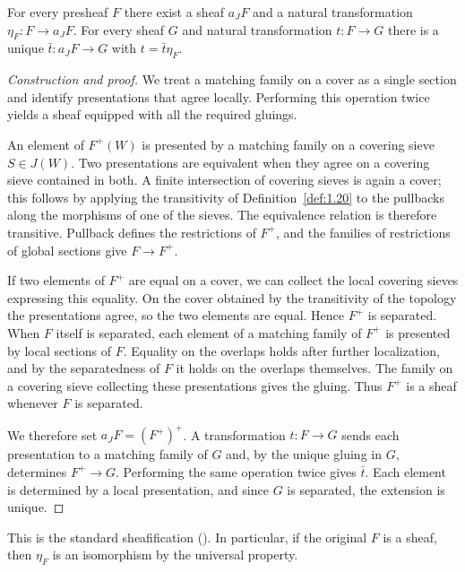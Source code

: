 \begin{proposition}[Sheafification]\label{prop:1.23}

For every presheaf $F$ there exist a sheaf $a_JF$ and a natural transformation
$\eta_F:F\to a_JF$. For every sheaf $G$ and natural transformation
$t:F\to G$ there is a unique $\bar t:a_JF\to G$ with $t=\bar t\eta_F$.

\end{proposition}

\begin{proof}[Construction and proof]

We treat a matching family on a cover as a single section and identify
presentations that agree locally.
Performing this operation twice yields a sheaf equipped with all the required
gluings.

An element of $F^+(W)$ is presented by a matching family on a covering sieve
$S\in J(W)$.
Two presentations are equivalent when they agree on a covering sieve contained
in both.
A finite intersection of covering sieves is again a cover; this follows by
applying the transitivity of Definition~\ref{def:1.20} to the pullbacks along
the morphisms of one of the sieves.
The equivalence relation is therefore transitive.
Pullback defines the restrictions of $F^+$, and the families of restrictions of
global sections give $F\to F^+$.

If two elements of $F^+$ are equal on a cover, we can collect the local covering
sieves expressing this equality. On the cover obtained by the transitivity of
the topology the presentations agree, so the two elements are equal.
Hence $F^+$ is separated.
When $F$ itself is separated, each element of a matching family of $F^+$ is
presented by local sections of $F$. Equality on the overlaps holds after further
localization, and by the separatedness of $F$ it holds on the overlaps themselves.
The family on a covering sieve collecting these presentations gives the gluing.
Thus $F^+$ is a sheaf whenever $F$ is separated.

We therefore set $a_JF=(F^+)^+$.
A transformation $t:F\to G$ sends each presentation to a matching family of $G$
and, by the unique gluing in $G$, determines $F^+\to G$.
Performing the same operation twice gives $\bar t$.
Each element is determined by a local presentation, and since $G$ is separated,
the extension is unique.

\end{proof}

This is the standard sheafification
(\cite[\href{https://stacks.math.columbia.edu/tag/00ZG}{\S7.49, Tag 00ZG}]{Stacks}).
In particular, if the original $F$ is a sheaf, then $\eta_F$ is an isomorphism
by the universal property.

